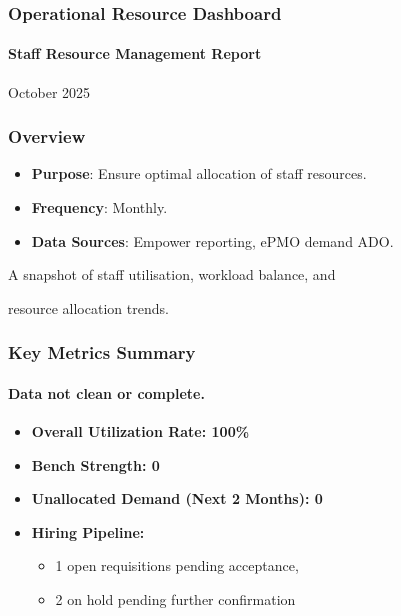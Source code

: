 \documentclass{beamer}
\begin{document}
\begin{frame}
\frametitle{Operational Resource Dashboard}
\framesubtitle{Staff Resource Management Report}October 2025
\end{frame}

\begin{frame}
\frametitle{Overview}
\begin{itemize}
\item \textbf{Purpose}: Ensure optimal allocation of staff resources.
\item \textbf{Frequency}: Monthly.
\item \textbf{Data Sources}: Empower reporting, ePMO demand ADO.
\end{itemize}
A snapshot of staff utilisation, workload balance, and 

resource allocation trends.
\end{frame}

\begin{frame}
\frametitle{Key Metrics Summary}
\framesubtitle{Data not clean or complete.}
\begin{itemize}
\item \textbf{Overall Utilization Rate: 100\%}
\item \textbf{Bench Strength: 0}
\item \textbf{Unallocated Demand (Next 2 Months): 0}
\item \textbf{Hiring Pipeline: }
\begin{itemize}
\item 1 open requisitions pending acceptance, 
\item 2 on hold pending further confirmation
\end{itemize}

\end{itemize}

\end{frame}
\end{document}
